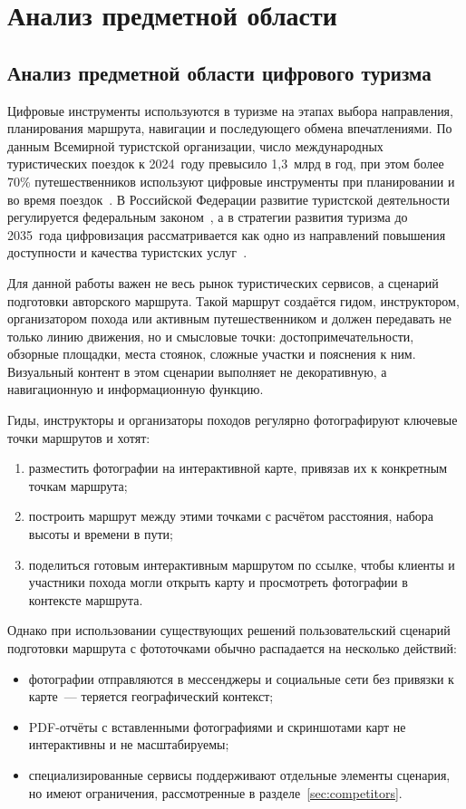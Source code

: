 \chapter{Анализ предметной области}

\section{Анализ предметной области цифрового туризма}

Цифровые инструменты используются в туризме на этапах выбора направления,
планирования маршрута, навигации и последующего обмена впечатлениями. По данным
Всемирной туристской организации, число международных туристических поездок к
2024~году превысило 1,3~млрд в год, при этом более 70\% путешественников
используют цифровые инструменты при планировании и во время поездок~\cite{unwto2024}.
В Российской Федерации развитие туристской деятельности регулируется федеральным
законом~\cite{tourismLaw132}, а в стратегии развития туризма до 2035~года
цифровизация рассматривается как одно из направлений повышения доступности и
качества туристских услуг~\cite{tourismStrategy2035}.

Для данной работы важен не весь рынок туристических сервисов, а сценарий
подготовки авторского маршрута. Такой маршрут создаётся гидом, инструктором,
организатором похода или активным путешественником и должен передавать не только
линию движения, но и смысловые точки: достопримечательности, обзорные площадки,
места стоянок, сложные участки и пояснения к ним. Визуальный контент в этом
сценарии выполняет не декоративную, а навигационную и информационную функцию.

Гиды, инструкторы и организаторы походов регулярно фотографируют ключевые точки
маршрутов и хотят:
\begin{enumerate}
  \item разместить фотографии на интерактивной карте, привязав их к конкретным точкам маршрута;
  \item построить маршрут между этими точками с расчётом расстояния, набора высоты и времени в пути;
  \item поделиться готовым интерактивным маршрутом по ссылке, чтобы клиенты и участники похода могли открыть карту и просмотреть фотографии в контексте маршрута.
\end{enumerate}

Однако при использовании существующих решений пользовательский сценарий
подготовки маршрута с фототочками обычно распадается на несколько действий:
\begin{itemize}
  \item фотографии отправляются в мессенджеры и социальные сети без привязки к карте~--- теряется географический контекст;
  \item PDF-отчёты с вставленными фотографиями и скриншотами карт не интерактивны и не масштабируемы;
  \item специализированные сервисы поддерживают отдельные элементы сценария, но
    имеют ограничения, рассмотренные в разделе~\ref{sec:competitors}.
\end{itemize}

